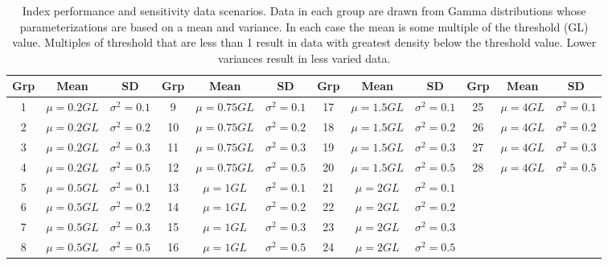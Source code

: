 \begin{table}[htbp]
\setlength{\tabcolsep}{5pt}
\caption{Index performance and sensitivity data scenarios. Data in each group are drawn from Gamma distributions whose parameterizations are based on a mean and variance.  In each case the mean is some multiple of the threshold (GL) value.
Multiples of threshold that are less than 1 result in data with greatest density below the threshold value.  Lower variances result in less varied data.}\label{tab:datascenarios}  
\scriptsize\begin{tabular}{ccc||ccc||ccc||ccc}
\toprule
Grp & Mean & SD & Grp & Mean & SD & Grp & Mean & SD & Grp & Mean & SD\\
\midrule	  
1 & $\mu = 0.2GL$ & $\sigma^2=0.1$ & 9 & $\mu = 0.75GL$ & $\sigma^2=0.1$ & 17 & $\mu = 1.5GL$ & $\sigma^2=0.1$  & 25 & $\mu = 4GL$ & $\sigma^2=0.1$\\
2 & $\mu = 0.2GL$ & $\sigma^2=0.2$ & 10& $\mu = 0.75GL$ & $\sigma^2=0.2$ & 18 & $\mu = 1.5GL$ & $\sigma^2=0.2$  & 26 & $\mu = 4GL$ & $\sigma^2=0.2$\\
3 & $\mu = 0.2GL$ & $\sigma^2=0.3$ & 11& $\mu = 0.75GL$ & $\sigma^2=0.3$ & 19 & $\mu = 1.5GL$ & $\sigma^2=0.3$  & 27 & $\mu = 4GL$ & $\sigma^2=0.3$\\
4 & $\mu = 0.2GL$ & $\sigma^2=0.5$ & 12& $\mu = 0.75GL$ & $\sigma^2=0.5$ & 20 & $\mu = 1.5GL$ & $\sigma^2=0.5$  & 28 & $\mu = 4GL$ & $\sigma^2=0.5$\\
5 & $\mu = 0.5GL$ & $\sigma^2=0.1$ & 13& $\mu = 1GL$ & $\sigma^2=0.1$ & 21 & $\mu = 2GL$ & $\sigma^2=0.1$\\
6 & $\mu = 0.5GL$ & $\sigma^2=0.2$ & 14& $\mu = 1GL$ & $\sigma^2=0.2$ & 22 & $\mu = 2GL$ & $\sigma^2=0.2$\\          
7 & $\mu = 0.5GL$ & $\sigma^2=0.3$ & 15& $\mu = 1GL$ & $\sigma^2=0.3$ & 23 & $\mu = 2GL$ & $\sigma^2=0.3$\\
8 & $\mu = 0.5GL$ & $\sigma^2=0.5$ & 16& $\mu = 1GL$ & $\sigma^2=0.5$ & 24 & $\mu = 2GL$ & $\sigma^2=0.5$\\          
\bottomrule
\end{tabular}	
\end{table}



